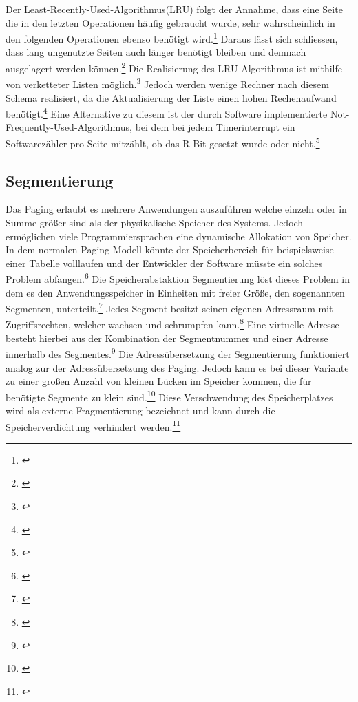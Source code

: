 Der Least-Recently-Used-Algorithmus(LRU) folgt der Annahme, dass eine Seite die in den letzten Operationen häufig gebraucht wurde, sehr wahrscheinlich in den folgenden Operationen ebenso benötigt wird.\footnote{\cite[S.~272]{Tanenbaum.2016}} Daraus lässt sich schliessen, dass lang ungenutzte Seiten auch länger benötigt bleiben und demnach ausgelagert werden können.\footnote{\cite[S.~272]{Tanenbaum.2016}} Die Realisierung des LRU-Algorithmus ist mithilfe von verketteter Listen möglich.\footnote{\cite[S.~272]{Tanenbaum.2016}} Jedoch werden wenige Rechner nach diesem Schema realisiert, da die Aktualisierung der Liste einen hohen Rechenaufwand benötigt.\footnote{\cite[S.~272]{Tanenbaum.2016}} Eine Alternative zu diesem ist der durch Software implementierte Not-Frequently-Used-Algorithmus, bei dem bei jedem Timerinterrupt ein Softwarezähler pro Seite mitzählt, ob das R-Bit gesetzt wurde oder nicht.\footnote{\cite[S.~273]{Tanenbaum.2016}}

\subsection{Segmentierung}
Das Paging erlaubt es mehrere Anwendungen auszuführen welche einzeln oder in Summe  größer sind als der physikalische Speicher des Systems. Jedoch ermöglichen viele Programmiersprachen eine dynamische Allokation von Speicher. In dem normalen Paging-Modell könnte der Speicherbereich für beispielsweise einer Tabelle volllaufen und der Entwickler der Software müsste ein solches Problem abfangen.\footnote{\cite[S.~302]{Tanenbaum.2016}} Die Speicherabstaktion Segmentierung löst dieses Problem in dem es den Anwendungsspeicher in Einheiten mit freier Größe, den sogenannten Segmenten, unterteilt.\footnote{\cite[S.~303]{Tanenbaum.2016}}  Jedes Segment besitzt seinen eigenen Adressraum mit Zugriffsrechten, welcher wachsen und schrumpfen kann.\footnote{\cite[S.~303]{Tanenbaum.2016}} Eine virtuelle Adresse besteht hierbei aus der Kombination der Segmentnummer und einer Adresse innerhalb des Segmentes.\footnote{\cite[S.~304]{Tanenbaum.2016}} Die Adressübersetzung der Segmentierung funktioniert analog zur der Adressübersetzung des Paging. Jedoch kann es bei dieser Variante zu einer großen Anzahl von kleinen Lücken im Speicher kommen, die für benötigte Segmente zu klein sind.\footnote{\cite[S.~306]{Tanenbaum.2016}} Diese Verschwendung des Speicherplatzes wird als externe Fragmentierung bezeichnet und kann durch die Speicherverdichtung verhindert werden.\footnote{\cite[S.~306]{Tanenbaum.2016}}

